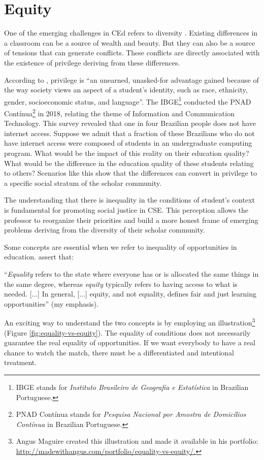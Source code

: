 \chapter{Equity}
\label{chap:equity}

 One of the emerging challenges in \acrfull{CEd} refers to diversity \cite[p.~19:2]{burgstahler:2011}. Existing differences in a classroom can be a source of wealth and beauty. But they can also be a source of tensions that can generate conflicts. These conflicts are directly associated with the existence of privilege deriving from these differences.
 
According to , privilege is “an unearned, unasked-for advantage gained because of the way society views an aspect of a student’s identity, such as race, ethnicity, gender, socioeconomic status, and language”. The \gls{IBGE}\footnote{IBGE stands for \textit{Instituto Brasileiro de Geografia e Estatística} in Brazilian Portuguese.} conducted the \gls{PNAD Contínua}\footnote{PNAD Contínua stands for \textit{Pesquisa Nacional por Amostra de Domicílios Contínua} in Brazilian Portuguese.} in 2018, relating the theme of Information and Communication Technology. This survey revealed that one in four Brazilian people does not have internet access. Suppose we admit that a fraction of these Brazilians who do not have internet access were composed of students in an undergraduate computing program. What would be the impact of this reality on their education quality? What would be the difference in the education quality of these students relating to others? Scenarios like this show that the differences can convert in privilege to a specific social stratum of the scholar community.

The understanding that there is inequality in the conditions of student's context is fundamental for promoting social justice in \acrfull{CSE}. This perception allows the professor to reorganize their priorities and build a more honest frame of emerging problems deriving from the diversity of their scholar community.

Some concepts are essential when we refer to inequality of opportunities in education.  assert that:
\begin{citacao}
    “\textit{Equality} refers to the state where everyone has or is allocated the same things in the same degree, whereas \textit{equity} typically refers to having access to what is needed. [...] In general, [...] equity, and not equality, defines fair and just learning opportunities” (my emphasis).
\end{citacao}
An exciting way to understand the two concepts is by employing an illustration\footnote{Angus Maguire created this illustration and made it available in his portfolio: \url{http://madewithangus.com/portfolio/equality-vs-equity/.}} (Figure \ref{fig:equality-vs-equity}). The equality of conditions does not necessarily guarantee the real equality of opportunities. If we want everybody to have a real chance to watch the match, there must be a differentiated and intentional treatment. 

